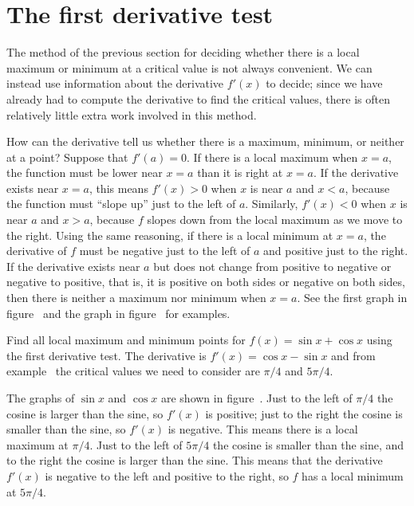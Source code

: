 \section{The first derivative test} {}{}
\nobreak
The method of the previous section for deciding whether there is a
local maximum or minimum at a critical value is not always
convenient. We can instead use information about the derivative
$f'(x)$ to decide; since we have already had to compute the derivative
to find the critical values, there is often relatively little extra
work involved in this method.

How can the derivative tell us whether there is a maximum, minimum, or
neither at a point? Suppose that $f'(a)=0$. If there is a local
maximum when $x=a$, the function must be lower near $x=a$ than it is
right at $x=a$. If the derivative exists near $x=a$, this means
$f'(x)>0$ when $x$ is near $a$ and $x<a$, because the function must
``slope up'' just to the left of $a$. Similarly, $f'(x)<0$ when $x$ is
near $a$ and $x>a$, because $f$ slopes down from the local maximum as
we move to the right. Using the same reasoning, if there is a local
minimum at $x=a$, the derivative of $f$ must be negative just to the
left of $a$ and positive just to the right. If the derivative exists
near $a$ but does not change from positive to negative or negative to
positive, that is, it is positive on both sides or negative on both
sides, then there is neither a maximum nor minimum when $x=a$.
See the first graph in figure~
and the graph in figure~
for examples.

\example Find all local maximum and minimum points for $f(x)=\sin x+\cos
x$ using the first derivative test.  The derivative is $f'(x)=\cos
x-\sin x$ and from example~ the critical
values we need to consider are $\pi/4$ and $5\pi/4$.

The graphs of $\sin x$ and $\cos x$ are shown in figure~. Just to the left of $\pi/4$ the cosine is larger than the
  sine, so $f'(x)$ is positive; just to the right the cosine is
  smaller than the sine, so $f'(x)$ is negative. This means there is a
  local maximum at $\pi/4$. Just to the left of $5\pi/4$ the cosine is
  smaller than the sine, and to the right the cosine is larger than
  the sine. This means that the derivative $f'(x)$ is negative to the
  left and positive to the right, so $f$ has a local minimum at
  $5\pi/4$.
\endexample


